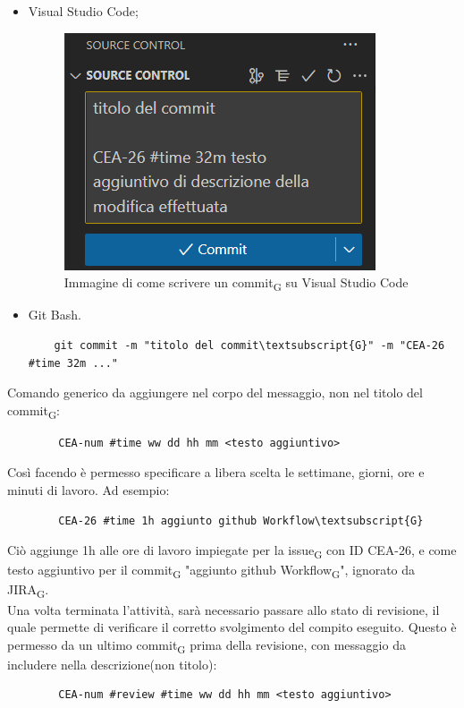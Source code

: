 	\begin{itemize}
		\item Visual Studio Code;
		\begin{figure}[ht!]
			\centering
			\includegraphics[scale=0.7]{img/visual_code_example.png}
			\caption{Immagine di come scrivere un commit\textsubscript{G} su Visual Studio Code}
		\end{figure}
		\item Git Bash.
		\begin{lstlisting}
	git commit -m "titolo del commit\textsubscript{G}" -m "CEA-26 #time 32m ..."
		\end{lstlisting}
	\end{itemize}
	Comando generico da aggiungere nel corpo del messaggio, non nel titolo del commit\textsubscript{G}:
	\begin{lstlisting}
		CEA-num #time ww dd hh mm <testo aggiuntivo>
	\end{lstlisting}
	Così facendo è permesso specificare a libera scelta le settimane, giorni, ore e minuti di lavoro. Ad esempio:
	\begin{lstlisting}
		CEA-26 #time 1h aggiunto github Workflow\textsubscript{G}
	\end{lstlisting}
	Ciò aggiunge 1h alle ore di lavoro impiegate per la issue\textsubscript{G} con ID CEA-26, e come testo aggiuntivo per il commit\textsubscript{G} "aggiunto github Workflow\textsubscript{G}", ignorato da JIRA\textsubscript{G}.\\
	Una volta terminata l'attività, sarà necessario passare allo stato di revisione, il quale permette di verificare il corretto svolgimento del compito eseguito. Questo è permesso da un ultimo commit\textsubscript{G} prima della revisione, con messaggio da includere nella descrizione(non titolo):
	\begin{lstlisting}
		CEA-num #review #time ww dd hh mm <testo aggiuntivo>
	\end{lstlisting}

